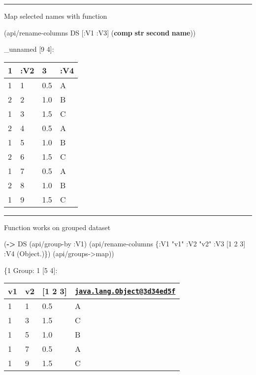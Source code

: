 \documentclass[]{article}
\newenvironment{Shaded}{\begin{snugshade}}{\end{snugshade}}
\newcommand{\AttributeTok}[1]{\textcolor[rgb]{0.77,0.63,0.00}{#1}}
\newcommand{\DecValTok}[1]{\textcolor[rgb]{0.00,0.00,0.81}{#1}}
\newcommand{\KeywordTok}[1]{\textcolor[rgb]{0.13,0.29,0.53}{\textbf{#1}}}
\newcommand{\NormalTok}[1]{#1}
\newcommand{\StringTok}[1]{\textcolor[rgb]{0.31,0.60,0.02}{#1}}
\begin{document}
\begin{center}\rule{0.5\linewidth}{0.5pt}\end{center}

Map selected names with function

\begin{Shaded}
\begin{Highlighting}[]
\NormalTok{(api/rename-columns DS [}\AttributeTok{:V1} \AttributeTok{:V3}\NormalTok{] (}\KeywordTok{comp} \KeywordTok{str} \KeywordTok{second} \KeywordTok{name}\NormalTok{))}
\end{Highlighting}
\end{Shaded}

\_unnamed {[}9 4{]}:

\begin{longtable}[]{@{}llll@{}}
\toprule
1 & :V2 & 3 & :V4\tabularnewline
\midrule
\endhead
1 & 1 & 0.5 & A\tabularnewline
2 & 2 & 1.0 & B\tabularnewline
1 & 3 & 1.5 & C\tabularnewline
2 & 4 & 0.5 & A\tabularnewline
1 & 5 & 1.0 & B\tabularnewline
2 & 6 & 1.5 & C\tabularnewline
1 & 7 & 0.5 & A\tabularnewline
2 & 8 & 1.0 & B\tabularnewline
1 & 9 & 1.5 & C\tabularnewline
\bottomrule
\end{longtable}

\begin{center}\rule{0.5\linewidth}{0.5pt}\end{center}

Function works on grouped dataset

\begin{Shaded}
\begin{Highlighting}[]
\NormalTok{(}\KeywordTok{->}\NormalTok{ DS}
\NormalTok{    (api/group-by }\AttributeTok{:V1}\NormalTok{)}
\NormalTok{    (api/rename-columns \{}\AttributeTok{:V1} \StringTok{"v1"}
                         \AttributeTok{:V2} \StringTok{"v2"}
                         \AttributeTok{:V3}\NormalTok{ [}\DecValTok{1} \DecValTok{2} \DecValTok{3}\NormalTok{]}
                         \AttributeTok{:V4}\NormalTok{ (Object.)\})}
\NormalTok{    (api/groups->map))}
\end{Highlighting}
\end{Shaded}

\{1 Group: 1 {[}5 4{]}:

\begin{longtable}[]{@{}llll@{}}
\toprule
v1 & v2 & {[}1 2 3{]} &
\href{mailto:java.lang.Object@3d34ed5f}{\nolinkurl{java.lang.Object@3d34ed5f}}\tabularnewline
\midrule
\endhead
1 & 1 & 0.5 & A\tabularnewline
1 & 3 & 1.5 & C\tabularnewline
1 & 5 & 1.0 & B\tabularnewline
1 & 7 & 0.5 & A\tabularnewline
1 & 9 & 1.5 & C\tabularnewline
\bottomrule
\end{longtable}
\end{document}
